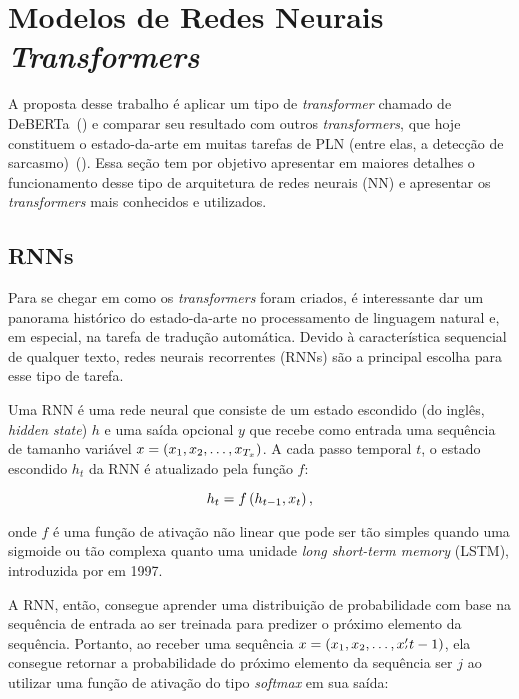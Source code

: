 \section{Modelos de Redes Neurais \textit{Transformers}}%
\label{sec:modelos_de_redes_neurais_transformers}

A proposta desse trabalho é aplicar um tipo de \textit{transformer} chamado de
DeBERTa~(\cite{he-etal:2020:deberta}) e comparar seu resultado com outros
\textit{transformers}, que hoje constituem o estado-da-arte em muitas tarefas de
PLN (entre elas, a detecção de
sarcasmo)~(\cite{joshi:2017:sarcasm-detection-survey}).  Essa seção tem por
objetivo apresentar em maiores detalhes o funcionamento desse tipo de
arquitetura de redes neurais (NN) e apresentar os \textit{transformers} mais
conhecidos e utilizados.

\subsection{RNNs}%
\label{sub:rnns}

Para se chegar em como os \textit{transformers} foram criados, é interessante
dar um panorama histórico do estado-da-arte no processamento de linguagem
natural e, em especial, na tarefa de tradução automática. Devido à
característica sequencial de qualquer texto, redes neurais recorrentes (RNNs)
são a principal escolha para esse tipo de tarefa.

Uma RNN é uma rede neural que consiste de um estado escondido (do inglês,
\textit{hidden state}) $h$ e uma saída opcional $y$ que recebe como entrada uma
sequência de tamanho variável $x=\left( x_1, x_2,\dots, x_{T_x} \right)$. A cada passo temporal
$t$, o estado escondido $h_t$ da RNN é atualizado pela função $f$:

\begin{equation}
h_t = f\left( h_{t-1}, x_t \right),
\label{eq:rnn}
\end{equation}

onde $f$ é uma função de ativação não linear que pode ser tão simples quando uma
sigmoide ou tão complexa quanto uma unidade \textit{long short-term memory}
(LSTM), introduzida por \cite{hochreiter-schmidhuber:1997:lstm} em 1997.

A RNN, então, consegue aprender uma distribuição de probabilidade com base na
sequência de entrada ao ser treinada para predizer o próximo elemento da
sequência. Portanto, ao receber uma sequência $x=\left( x_1, x_2,\dots, x_{'}'{t-1} \right)$, ela
consegue retornar a probabilidade do próximo elemento da sequência ser $j$ ao
utilizar uma função de ativação do tipo \textit{softmax} em sua saída:

